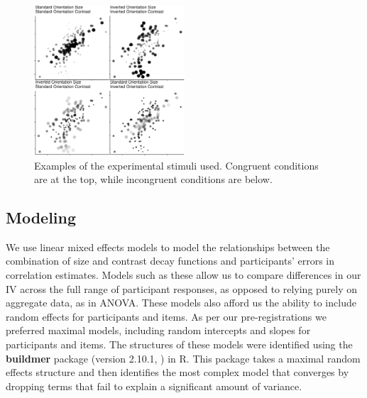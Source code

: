 \documentclass[manuscript, review, anonymous, screen]{acmart}
\begin{document}
\begin{figure}

\includegraphics[width=0.5\textwidth,height=\textheight]{size_and_contrast_files/figure-pdf/fig-examples-1.pdf} \hfill{}

\caption{\label{fig-examples}Examples of the experimental stimuli used.
Congruent conditions are at the top, while incongruent conditions are
below.}
\end{figure}

\hypertarget{sec-gen-modelling}{%
\subsection{Modeling}\label{sec-gen-modelling}}

We use linear mixed effects models to model the relationships between
the combination of size and contrast decay functions and participants'
errors in correlation estimates. Models such as these allow us to
compare differences in our IV across the full range of participant
responses, as opposed to relying purely on aggregate data, as in ANOVA.
These models also afford us the ability to include random effects for
participants and items. As per our pre-registrations we preferred
maximal models, including random intercepts and slopes for participants
and items. The structures of these models were identified using the
\textbf{buildmer} package (version 2.10.1, \citep{voeten_buildmer})  in R. 
This package takes a maximal random effects
structure and then identifies the most complex model that converges by
dropping terms that fail to explain a significant amount of variance.
\end{document}
